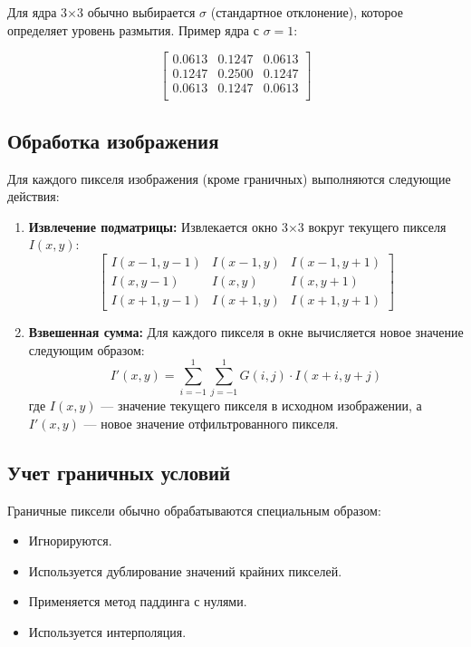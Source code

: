 \documentclass[14pt]{extarticle}
\theoremstyle{definition}
\theoremstyle{remark}
\begin{document}
Для ядра 3×3 обычно выбирается $\sigma$ (стандартное отклонение), которое определяет уровень размытия. Пример ядра с $\sigma = 1$:

$$
\begin{bmatrix}
0.0613 & 0.1247 & 0.0613 \\
0.1247 & 0.2500 & 0.1247 \\
0.0613 & 0.1247 & 0.0613 \\
\end{bmatrix}
$$

\subsection{Обработка изображения}

Для каждого пикселя изображения (кроме граничных) выполняются следующие действия:

\begin{enumerate}
    \item \textbf{Извлечение подматрицы:} Извлекается окно 3×3 вокруг текущего пикселя $I(x,y)$:
    \begin{equation}
    \begin{bmatrix}
    I(x-1, y-1) & I(x-1, y) & I(x-1, y+1) \\
    I(x, y-1) & I(x, y) & I(x, y+1) \\
    I(x+1, y-1) & I(x+1, y) & I(x+1, y+1)
    \end{bmatrix}
    \end{equation}
    
    \item \textbf{Взвешенная сумма:} Для каждого пикселя в окне вычисляется новое значение следующим образом:
    \begin{equation}
    I'(x, y) = \sum_{i=-1}^{1} \sum_{j=-1}^{1} G(i, j) \cdot I(x+i, y+j)
    \end{equation}
    где $I(x, y)$ — значение текущего пикселя в исходном изображении, а $I'(x, y)$ — новое значение отфильтрованного пикселя.

\end{enumerate}

\subsection{Учет граничных условий}

Граничные пиксели обычно обрабатываются специальным образом:
\begin{itemize}
    \item Игнорируются.
    \item Используется дублирование значений крайних пикселей.
    \item Применяется метод паддинга с нулями.
    \item Используется интерполяция.
\end{itemize}
\end{document}
